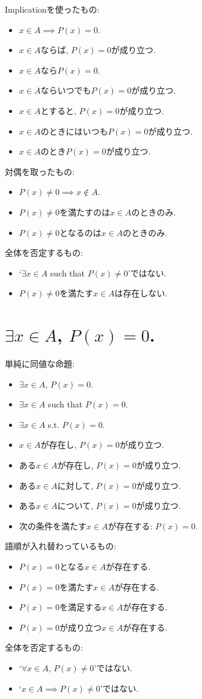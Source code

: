 \documentclass[a4paper,12pt,draft]{amsart}
\begin{document}
Implicationを使ったもの:
\begin{itemize}
\item $x \in A\implies P(x)=0$.
\item $x\in A$ならば, $P(x)=0$が成り立つ.
\item $x\in A$なら$P(x)=0$.
\item $x\in A$ならいつでも$P(x)=0$が成り立つ.
\item $x\in A$とすると, $P(x)=0$が成り立つ.
\item $x\in A$のときにはいつも$P(x)=0$が成り立つ.
\item $x\in A$のとき$P(x)=0$が成り立つ.
\end{itemize}
対偶を取ったもの:
\begin{itemize}
\item $P(x)\neq 0\implies x\not\in A$.
\item $P(x)\neq 0$を満たすのは$x\in A$のときのみ.
\item $P(x)\neq 0$となるのは$x\in A$のときのみ.
\end{itemize}
全体を否定するもの:
\begin{itemize}
\item `$\exists x\in A$ such that $P(x)\neq 0$'ではない.
\item $P(x)\neq 0$を満たす$x\in A$は存在しない.
\end{itemize}


\section{$\exists x \in A$, $P(x)=0$.}
単純に同値な命題:
\begin{itemize}
\item $\exists x \in A$, $P(x)=0$.
\item $\exists x \in A$ such that $P(x)=0$.
\item $\exists x \in A$ s.t. $P(x)=0$.
\item $x\in A$が存在し, $P(x)=0$が成り立つ.
\item ある$x\in A$が存在し, $P(x)=0$が成り立つ.
\item ある$x\in A$に対して, $P(x)=0$が成り立つ.
\item ある$x\in A$について, $P(x)=0$が成り立つ.
\item 次の条件を満たす$x\in A$が存在する: $P(x)=0$.
\end{itemize}
語順が入れ替わっているもの:
\begin{itemize}
\item $P(x)=0$となる$x\in A$が存在する.
\item $P(x)=0$を満たす$x\in A$が存在する.
\item $P(x)=0$を満足する$x\in A$が存在する.
\item $P(x)=0$が成り立つ$x\in A$が存在する.
\end{itemize}
全体を否定するもの:
\begin{itemize}
\item `$\forall x \in A$, $P(x)\neq 0$'ではない.
\item `$x \in A\implies P(x)\neq 0$'ではない.
\end{itemize}
\end{document}
